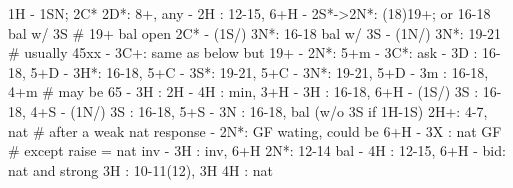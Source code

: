 1H - 1SN; 2C*
2D*: 8+, any
   - 2H : 12-15, 6+H
   - 2S*->2N*: (18)19+; or 16-18 bal w/ 3S  # 19+ bal open 2C*
             - (1S/) 3N*: 16-18 bal w/ 3S
             - (1N/) 3N*: 19-21  # usually 45xx
             - 3C+: same as below but 19+
   - 2N*: 5+m
        - 3C*: ask
            - 3D : 16-18, 5+D
            - 3H*: 16-18, 5+C
            - 3S*: 19-21, 5+C
            - 3N*: 19-21, 5+D
   - 3m : 16-18, 4+m  # may be 65
        - 3H : 2H
        - 4H : min, 3+H
   - 3H : 16-18, 6+H
   - (1S/) 3S : 16-18, 4+S
   - (1N/) 3S : 16-18, 5+S
   - 3N : 16-18, bal (w/o 3S if 1H-1S)
2H+: 4-7, nat
# after a weak nat response
   - 2N*: GF wating, could be 6+H
   - 3X : nat GF  # except raise = nat inv
   - 3H : inv, 6+H
2N*: 12-14 bal
   - 4H : 12-15, 6+H
   - bid: nat and strong
3H : 10-11(12), 3H
4H : nat